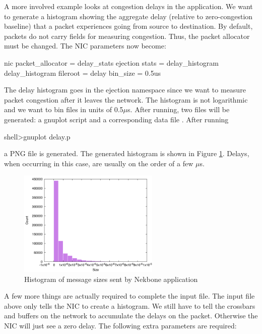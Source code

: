A more involved example looks at congestion delays in the application.
We want to generate a histogram showing the aggregate delay (relative to zero-congestion baseline) that a packet experiences
going from source to destination.
By default, packets do not carry fields for measuring congestion. 
Thus, the packet allocator must be changed.
The NIC parameters now become:

\begin{ViFile}
nic {
 packet_allocator = delay_stats
 ejection {
  stats = delay_histogram
  delay_histogram {
   fileroot = delay
   bin_size = 0.5us
  }
 }
}
\end{ViFile}
The delay histogram goes in the ejection namespace since we want to measure packet congestion after it leaves the network.
The histogram is not logarithmic and we want to bin files in units of 0.5$\mu$s.
After running, two files will be generated: a gnuplot script and a corresponding data file .
After running

\begin{ShellCmd}
shell>gnuplot delay.p 
\end{ShellCmd}
a PNG file  is generated.
The generated histogram is shown in Figure \ref{fig:nekboneDelayHistogram}. 
Delays, when occurring in this case, are usually on the order of a few $\mu$s.

\begin{figure}
\centering
\includegraphics[width=0.6\textwidth]{figures/delayHistogramNekbone}
\caption{Histogram of message sizes sent by Nekbone application}
\label{fig:nekboneDelayHistogram}
\end{figure}

A few more things are actually required to complete the input file.
The input file above only tells the NIC to create a histogram.
We still have to tell the crossbars and buffers on the network to accumulate the delays on the packet.
Otherwise the NIC will just see a zero delay.
The following extra parameters are required:

